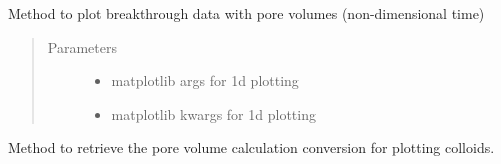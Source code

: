 \documentclass[letterpaper,10pt,english]{sphinxmanual}
\begin{document}
\begin{fulllineitems}
\begin{fulllineitems}
\end{fulllineitems}


\begin{fulllineitems}
\label{\detokenize{index:lb_colloids.Colloids.Colloid_output.Breakthrough.plot_pv}}
Method to plot breakthrough data with pore
volumes (non-dimensional time)
\begin{quote}\begin{description}
\item[{Parameters}] \leavevmode\begin{itemize}
\item {} 
 \textendash{} 
matplotlib args for 1d plotting


\item {} 
 \textendash{} 
matplotlib kwargs for 1d plotting


\end{itemize}

\end{description}\end{quote}

\end{fulllineitems}


\begin{fulllineitems}
\label{\detokenize{index:lb_colloids.Colloids.Colloid_output.Breakthrough.pore_volume_conversion}}
Method to retrieve the pore volume calculation
conversion for plotting colloids.

\end{fulllineitems}


\end{fulllineitems}

\end{document}
